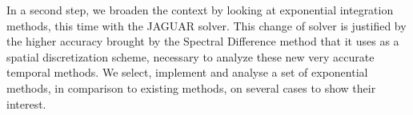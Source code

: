 In a second step, we broaden the context by looking at exponential integration methods, this time with the JAGUAR solver.
This change of solver is justified by the higher accuracy brought by the Spectral Difference method that it uses as a spatial discretization scheme, necessary to analyze these new very accurate temporal methods.
We select, implement and analyse a set of exponential methods, in comparison to existing methods, on several cases to show their interest.
